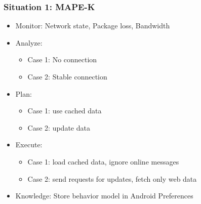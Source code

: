 \documentclass[aspectratio=169]{beamer}
\begin{document}
\begin{frame}   
	\frametitle{Situation 1: MAPE-K}
	\begin{itemize}
		\item Monitor: Network state, Package loss, Bandwidth
		\item Analyze: 
			 \begin{itemize} 
				\item Case 1: No connection
				\item Case 2: Stable connection
			\end{itemize}
		\item Plan:
			\begin{itemize}
				\item Case 1: use cached data 
				\item Case 2:  update data
			\end{itemize}
		\item Execute:
			\begin{itemize}
				\item Case 1: load cached data, ignore online messages
    				\item Case 2: send requests for updates, fetch only web data 
			\end{itemize}
		\item Knowledge: Store behavior model in Android Preferences
	\end{itemize}
\end{frame}
\end{document}
